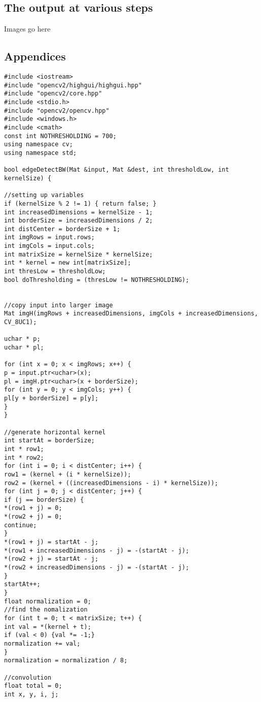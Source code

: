 \documentclass{article}
\begin{document}
\subsection{The output at various steps}
Images go here

\subsection{Appendices}
\begin{lstlisting}
#include <iostream> 
#include "opencv2/highgui/highgui.hpp"
#include "opencv2/core.hpp"
#include <stdio.h>
#include "opencv2/opencv.hpp"
#include <windows.h> 
#include <cmath>
const int NOTHRESHOLDING = 700;
using namespace cv;
using namespace std;

bool edgeDetectBW(Mat &input, Mat &dest, int thresholdLow, int kernelSize) {

//setting up variables
if (kernelSize % 2 != 1) { return false; }
int increasedDimensions = kernelSize - 1;
int borderSize = increasedDimensions / 2;
int distCenter = borderSize + 1;
int imgRows = input.rows;
int imgCols = input.cols;
int matrixSize = kernelSize * kernelSize;
int * kernel = new int[matrixSize];
int thresLow = thresholdLow;
bool doThresholding = (thresLow != NOTHRESHOLDING);


//copy input into larger image
Mat imgH(imgRows + increasedDimensions, imgCols + increasedDimensions, CV_8UC1);

uchar * p;
uchar * pl;

for (int x = 0; x < imgRows; x++) {
p = input.ptr<uchar>(x);
pl = imgH.ptr<uchar>(x + borderSize);
for (int y = 0; y < imgCols; y++) {
pl[y + borderSize] = p[y];
}
}

//generate horizontal kernel
int startAt = borderSize;
int * row1;
int * row2;
for (int i = 0; i < distCenter; i++) {
row1 = (kernel + (i * kernelSize));
row2 = (kernel + ((increasedDimensions - i) * kernelSize));
for (int j = 0; j < distCenter; j++) {
if (j == borderSize) {
*(row1 + j) = 0;
*(row2 + j) = 0;
continue;
}
*(row1 + j) = startAt - j;
*(row1 + increasedDimensions - j) = -(startAt - j);
*(row2 + j) = startAt - j;
*(row2 + increasedDimensions - j) = -(startAt - j);
}
startAt++;
}
float normalization = 0;
//find the nomalization
for (int t = 0; t < matrixSize; t++) {
int val = *(kernel + t);
if (val < 0) {val *= -1;}
normalization += val;
}
normalization = normalization / 8;

//convolution
float total = 0;
int x, y, i, j;


\end{lstlisting}
\end{document}
